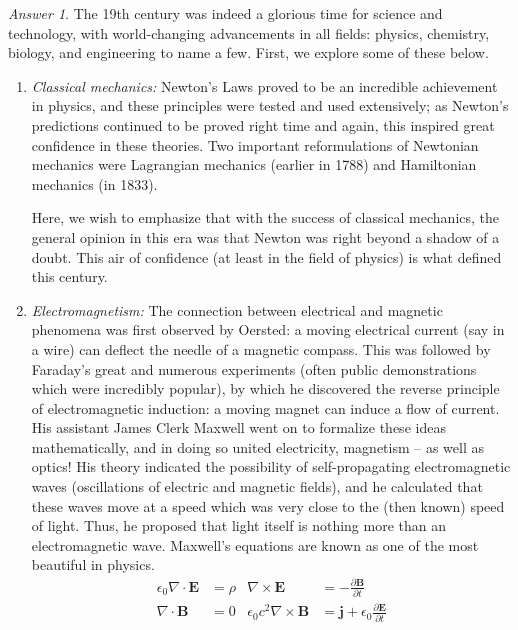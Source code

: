 \documentclass[11pt]{article}
\theoremstyle{remark}
\newtheorem*{answer}{Answer}
\begin{document}
    \begin{answer}
        The 19th century was indeed a glorious time for science and technology, with
        world-changing advancements in all fields: physics, chemistry, biology, and
        engineering to name a few. First, we explore some of these below.
        \begin{enumerate}
            \item \textit{Classical mechanics:} Newton's Laws proved to be an
            incredible achievement in physics, and these principles were tested and
            used extensively; as Newton's predictions continued to be proved right
            time and again, this inspired great confidence in these theories. Two
            important reformulations of Newtonian mechanics were Lagrangian mechanics
            (earlier in 1788) and Hamiltonian mechanics (in 1833).

            Here, we wish to emphasize that with the success of classical mechanics,
            the general opinion in this era was that Newton was right beyond a shadow
            of a doubt. This air of confidence (at least in the field of physics) is
            what defined this century.

            \item \textit{Electromagnetism:} The connection between electrical and
            magnetic phenomena was first observed by Oersted: a moving electrical
            current (say in a wire) can deflect the needle of a magnetic compass.
            This was followed by Faraday's great and numerous experiments (often
            public demonstrations which were incredibly popular), by which he
            discovered the reverse principle of electromagnetic induction: a moving
            magnet can induce a flow of current. His assistant James Clerk Maxwell
            went on to formalize these ideas mathematically, and in doing so united
            electricity, magnetism -- as well as optics! His theory indicated the
            possibility of self-propagating electromagnetic waves (oscillations of
            electric and magnetic fields), and he calculated that these waves move at
            a speed which was very close to the (then known) speed of light. Thus, he
            proposed that light itself is nothing more than an electromagnetic wave.
            Maxwell's equations are known as one of the most beautiful in physics.
            \begin{align*}
                \epsilon_0 \nabla\cdot \mathbf{E} &= \rho & 
                \nabla\times \mathbf{E} &= -\frac{\partial \mathbf{B}}{\partial t} \\
                \nabla \cdot \mathbf{B} &= 0 &
                \epsilon_0c^2\nabla\times \mathbf{B} &= \mathbf{j} + \epsilon_0\frac{\partial
                \mathbf{E}}{\partial t}
            \end{align*}


\end{enumerate}
\end{answer}
\end{document}
